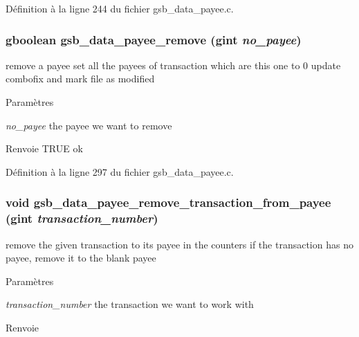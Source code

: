 Définition à la ligne 244 du fichier gsb\_\-data\_\-payee.c.

\subsubsection[{gsb\_\-data\_\-payee\_\-remove}]{\setlength{\rightskip}{0pt plus 5cm}gboolean gsb\_\-data\_\-payee\_\-remove (gint {\em no\_\-payee})}\label{gsb__data__payee_8h_a405a586d7f5ca10be88e833b68fa7d57}
remove a payee set all the payees of transaction which are this one to 0 update combofix and mark file as modified


\begin{DoxyParams}{Paramètres}
\item[{\em no\_\-payee}]the payee we want to remove\end{DoxyParams}
\begin{DoxyReturn}{Renvoie}
TRUE ok 
\end{DoxyReturn}


Définition à la ligne 297 du fichier gsb\_\-data\_\-payee.c.

\subsubsection[{gsb\_\-data\_\-payee\_\-remove\_\-transaction\_\-from\_\-payee}]{\setlength{\rightskip}{0pt plus 5cm}void gsb\_\-data\_\-payee\_\-remove\_\-transaction\_\-from\_\-payee (gint {\em transaction\_\-number})}\label{gsb__data__payee_8h_afeef17c3b690983a07a2f373e5de6b55}
remove the given transaction to its payee in the counters if the transaction has no payee, remove it to the blank payee


\begin{DoxyParams}{Paramètres}
\item[{\em transaction\_\-number}]the transaction we want to work with\end{DoxyParams}
\begin{DoxyReturn}{Renvoie}

\end{DoxyReturn}


